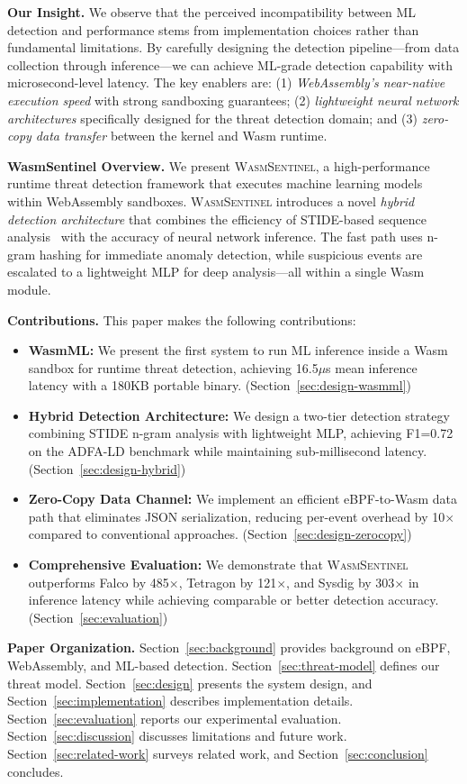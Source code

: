 \textbf{Our Insight.}
We observe that the perceived incompatibility between ML detection and performance stems from implementation choices rather than fundamental limitations.
By carefully designing the detection pipeline---from data collection through inference---we can achieve ML-grade detection capability with microsecond-level latency.
The key enablers are:
(1) \textit{WebAssembly's near-native execution speed} with strong sandboxing guarantees;
(2) \textit{lightweight neural network architectures} specifically designed for the threat detection domain;
and (3) \textit{zero-copy data transfer} between the kernel and Wasm runtime.

\textbf{WasmSentinel Overview.}
We present \textsc{WasmSentinel}, a high-performance runtime threat detection framework that executes machine learning models within WebAssembly sandboxes.
\textsc{WasmSentinel} introduces a novel \textit{hybrid detection architecture} that combines the efficiency of STIDE-based sequence analysis~\cite{stide} with the accuracy of neural network inference.
The fast path uses n-gram hashing for immediate anomaly detection, while suspicious events are escalated to a lightweight MLP for deep analysis---all within a single Wasm module.

\textbf{Contributions.}
This paper makes the following contributions:

\begin{itemize}
    \item \textbf{WasmML:} We present the first system to run ML inference inside a Wasm sandbox for runtime threat detection, achieving 16.5$\mu$s mean inference latency with a 180KB portable binary. (Section~\ref{sec:design-wasmml})

    \item \textbf{Hybrid Detection Architecture:} We design a two-tier detection strategy combining STIDE n-gram analysis with lightweight MLP, achieving F1=0.72 on the ADFA-LD benchmark while maintaining sub-millisecond latency. (Section~\ref{sec:design-hybrid})

    \item \textbf{Zero-Copy Data Channel:} We implement an efficient eBPF-to-Wasm data path that eliminates JSON serialization, reducing per-event overhead by 10$\times$ compared to conventional approaches. (Section~\ref{sec:design-zerocopy})

    \item \textbf{Comprehensive Evaluation:} We demonstrate that \textsc{WasmSentinel} outperforms Falco by 485$\times$, Tetragon by 121$\times$, and Sysdig by 303$\times$ in inference latency while achieving comparable or better detection accuracy. (Section~\ref{sec:evaluation})
\end{itemize}

\textbf{Paper Organization.}
Section~\ref{sec:background} provides background on eBPF, WebAssembly, and ML-based detection.
Section~\ref{sec:threat-model} defines our threat model.
Section~\ref{sec:design} presents the system design, and Section~\ref{sec:implementation} describes implementation details.
Section~\ref{sec:evaluation} reports our experimental evaluation.
Section~\ref{sec:discussion} discusses limitations and future work.
Section~\ref{sec:related-work} surveys related work, and Section~\ref{sec:conclusion} concludes.
